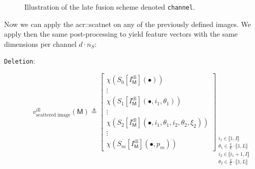             \begin{figure}[htb]
                \centering
                
                \caption{
                    \label{fig::channel}
                    Illustration of the late fusion scheme denoted \texttt{channel}.
                }
            \end{figure}

            Now we can apply the \gls{acr::scatnet} on any of the previously defined images.
            We apply then the same post-processing to yield feature vectors with the same dimensions per channel \(d \cdot n_S\):

            \begin{description}
                \item[\texttt{Deletion}:]
                        \begin{equation}
                            \label{eq::deletion_scanetg_image_based_features}
                            v^{\text{dl}}_{\text{scattered image}}\left(\mathsf{M}\right) \triangleq \begin{bmatrix}
                                \chi \left(S_0[I^{\text{dl}}_{\mathsf{M}}]\left(\bullet\right)\right)\\
                                \vdots\\
                                \chi \left(S_1[I^{\text{dl}}_{\mathsf{M}}]\left(\bullet, i_1, \theta_1\right)\right)\\
                                \vdots\\
                                \chi \left(S_2[I^{\text{dl}}_{\mathsf{M}}]\left(\bullet, i_1, \theta_1, i_2, \theta_2, \xi_2\right)\right)\\
                                \vdots\\
                                \chi \left(S_m[I^{\text{dl}}_{\mathsf{M}}]\left(\bullet, p_m\right)\right)
                            \end{bmatrix}_{
                                \substack{
                                    i_1 \in \llbracket 1, I \rrbracket\\
                                    \theta_1 \in \frac{\pi}{L} \cdot \llbracket 1, L \rrbracket\\
                                    i_2 \in \llbracket i_1 + 1, I \rrbracket\\
                                    \theta_2 \in \frac{\pi}{L} \cdot \llbracket 1, L \rrbracket\\
}}
\end{equation}
\end{description}
